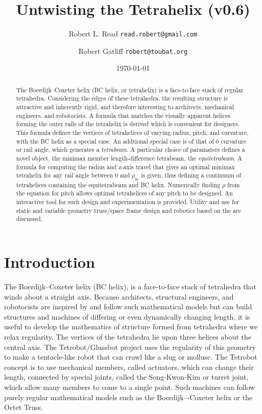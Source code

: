 \documentclass[11pt]{article}
\title{Untwisting the Tetrahelix (v0.6)}
\author{Robert L. Read \texttt{read.robert@gmail.com} \and
  Robert Gatliff \texttt{robert@toubat.org}
}
\date{\today}
\begin{document}
\maketitle


\begin{abstract}
  The Boerdijk--Coxeter helix (BC helix, or tetrahelix) is a
  face-to-face stack of regular tetrahedra.  Considering the edges of
  these tetrahedra, the resulting structure is attractive and
  inherently rigid, and therefore interesting to architects,
  mechanical engineers, and robotocists.  A formula that matches the
  visually apparent helices forming the outer rails of the tetrahelix
  is derived which is convenient for designers.  This formula defines
  the vertices of tetrahelices of varying radius, pitch, and
  curvature, with the BC helix as a special case.  An addtional
  special case is of that of $0$ curvature or rail angle, which
  generates a \emph{tetrabeam}.  A particular choice of paramaters
  defines a novel object, the minimax member length-difference
  tetrabeam, the \emph{equitetrabeam}.  A formula for computing the
  radius and z-axis travel that gives an optimal minimax tetrahelix
  for any rail angle between $0$ and $\rho_{bc}$ is given, thus
  defining a continuum of tetrahelices containing the equitetrabeam
  and BC helix. Numerically finding $\rho$ from the equation for
  pitch allows optimal tetrahelices of any pitch to be designed.
  An interactive tool for such design and experimentation is provided.
  Utility and use for static and variable geometry
  truss/space frame design and robotics based on the are discussed.
\end{abstract}


\section{Introduction}

The Boerdijk--Coxeter helix\cite{coxeter1985simplicial} (BC helix), is
a face-to-face stack of tetrahedra that winds about a straight axis.
Because architects, structural engineers, and robotocists are inspired
by and follow such mathematical models but can build structures and
machines of differing or even dynamically changing length, it is
useful to develop the mathematics of structure formed from tetrahedra
where we relax regularity.  The vertices of the tetrahedra lie upon
three helices about the central axis.  The
Tetrobot/Glussbot\cite{TetrobotBook} project uses the regularity of
this geometry to make a tentacle-like robot that can crawl like a slug
or mollusc.  The Tetrobot concept is to use mechanical members, called
actuators, which can change their length, connected by special joints,
called the Song-Kwon-Kim\cite{song2003spherical} or turret joint,
which allow many members to come to a single point.  Such machines can
follow purely regular mathematical models such as the Boerdijk–-Coxeter
helix or the Octet Truss\cite{richard1961synergetic}.
\end{document}
